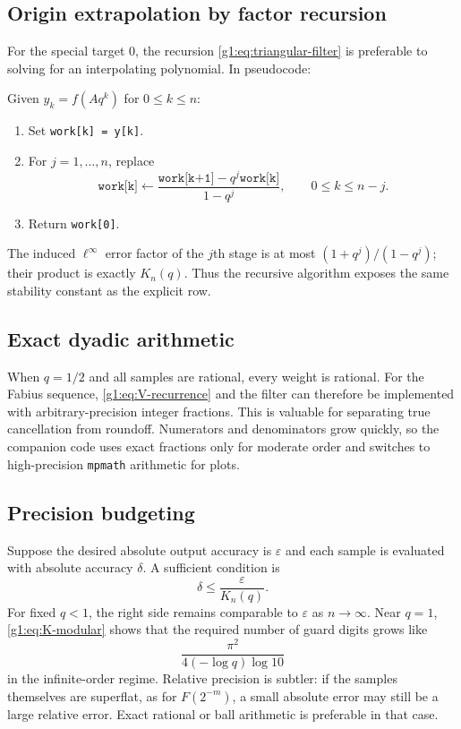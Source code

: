 \subsection{Origin extrapolation by factor recursion}

For the special target $0$, the recursion \eqref{g1:eq:triangular-filter} is
preferable to solving for an interpolating polynomial.  In pseudocode:

\begin{algorithm}
Given $y_k=f(Aq^k)$ for $0\le k\le n$:
\begin{enumerate}[leftmargin=2em]
\item Set \texttt{work[k] = y[k]}.
\item For $j=1,\ldots,n$, replace
\[
 \texttt{work[k]}
 \leftarrow
 \frac{\texttt{work[k+1]}-q^j\texttt{work[k]}}{1-q^j},
 \qquad 0\le k\le n-j.
\]
\item Return \texttt{work[0]}.
\end{enumerate}
\end{algorithm}

The induced $\ell^\infty$ error factor of the $j$th stage is at most
$(1+q^j)/(1-q^j)$; their product is exactly $K_n(q)$.  Thus the recursive
algorithm exposes the same stability constant as the explicit row.

\subsection{Exact dyadic arithmetic}

When $q=1/2$ and all samples are rational, every weight is rational.  For the
Fabius sequence, \eqref{g1:eq:V-recurrence} and the filter can therefore be
implemented with arbitrary-precision integer fractions.  This is valuable for
separating true cancellation from roundoff.  Numerators and denominators grow
quickly, so the companion code uses exact fractions only for moderate order and
switches to high-precision \texttt{mpmath} arithmetic for plots.

\subsection{Precision budgeting}

Suppose the desired absolute output accuracy is $\varepsilon$ and each sample
is evaluated with absolute accuracy $\delta$.  A sufficient condition is
\begin{equation}
 \delta\le\frac{\varepsilon}{K_n(q)}.
 \label{g1:eq:precision-budget}
\end{equation}
For fixed $q<1$, the right side remains comparable to $\varepsilon$ as
$n\to\infty$.  Near $q=1$, \eqref{g1:eq:K-modular} shows that the required number
of guard digits grows like
\[
 \frac{\pi^2}{4(-\log q)\log 10}
\]
in the infinite-order regime.  Relative precision is subtler: if the samples
themselves are superflat, as for $F(2^{-m})$, a small absolute error may still
be a large relative error.  Exact rational or ball arithmetic is preferable in
that case.

